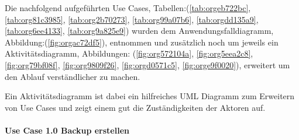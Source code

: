Die nachfolgend aufgeführten Use Cases, Tabellen:(\ref{tab:orgeb722bc}, \ref{tab:org81c3985},
\ref{tab:org2b70273}, \ref{tab:org99a07b6}, \ref{tab:orgdd135a9}, \ref{tab:org6ee4133}, \ref{tab:org9a825e9})
wurden dem Anwendungsfalldiagramm, Abbildung:(\ref{fig:orgac72df5}), entnommen und
zusätzlich noch um jeweils ein Aktivitätsdiagramm, Abbildungen:
(\ref{fig:org572104a}, \ref{fig:org5eea2c8}, \ref{fig:org79bf08f},
\ref{fig:org9809f26}, \ref{fig:orgd0571c5}, \ref{fig:orge9f0020}), erweitert
um den Ablauf verständlicher zu machen.

Ein Aktivitätsdiagramm ist dabei ein hilfreiches UML Diagramm zum Erweitern von
Use Cases und zeigt einem gut die Zuständigkeiten der Aktoren auf.

\paragraph{Use Case 1.0 Backup erstellen}
\label{sec:org2b8ffdd}

